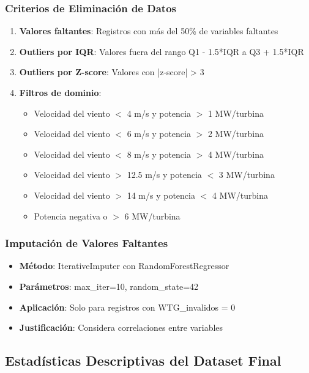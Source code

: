 \documentclass[conference]{IEEEtran}
\begin{document}
	\subsubsection{Criterios de Eliminación de Datos}
	\begin{enumerate}[leftmargin=*]
		\item \textbf{Valores faltantes}: Registros con más del 50\% de variables faltantes
		\item \textbf{Outliers por IQR}: Valores fuera del rango Q1 - 1.5*IQR a Q3 + 1.5*IQR
		\item \textbf{Outliers por Z-score}: Valores con |z-score| > 3
		\item \textbf{Filtros de dominio}:
		\begin{itemize}
			\item Velocidad del viento $<$ 4 m/s y potencia $>$ 1 MW/turbina
			\item Velocidad del viento $<$ 6 m/s y potencia $>$ 2 MW/turbina
			\item Velocidad del viento $<$ 8 m/s y potencia $>$ 4 MW/turbina
			\item Velocidad del viento $>$ 12.5 m/s y potencia $<$ 3 MW/turbina
			\item Velocidad del viento $>$ 14 m/s y potencia $<$ 4 MW/turbina
			\item Potencia negativa o $>$ 6 MW/turbina
		\end{itemize}
	\end{enumerate}
	
	\subsubsection{Imputación de Valores Faltantes}
	\begin{itemize}[leftmargin=*]
		\item \textbf{Método}: IterativeImputer con RandomForestRegressor
		\item \textbf{Parámetros}: max\_iter=10, random\_state=42
		\item \textbf{Aplicación}: Solo para registros con WTG\_invalidos = 0
		\item \textbf{Justificación}: Considera correlaciones entre variables
	\end{itemize}
	
	\subsection{Estadísticas Descriptivas del Dataset Final}
	
\end{document}
